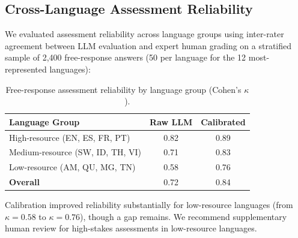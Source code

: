 \subsection{Cross-Language Assessment Reliability}

We evaluated assessment reliability across language groups using inter-rater agreement between LLM evaluation and expert human grading on a stratified sample of 2,400 free-response answers (50 per language for the 12 most-represented languages):

\begin{table}[H]
\centering
\caption{Free-response assessment reliability by language group (Cohen's $\kappa$).}
\label{tab:language_reliability}
\begin{tabular}{@{}lcc@{}}
\toprule
\textbf{Language Group} & \textbf{Raw LLM} & \textbf{Calibrated} \\
\midrule
High-resource (EN, ES, FR, PT) & 0.82 & 0.89 \\
Medium-resource (SW, ID, TH, VI) & 0.71 & 0.83 \\
Low-resource (AM, QU, MG, TN) & 0.58 & 0.76 \\
\midrule
\textbf{Overall} & 0.72 & 0.84 \\
\bottomrule
\end{tabular}
\end{table}

Calibration improved reliability substantially for low-resource languages (from $\kappa = 0.58$ to $\kappa = 0.76$), though a gap remains.
We recommend supplementary human review for high-stakes assessments in low-resource languages.

